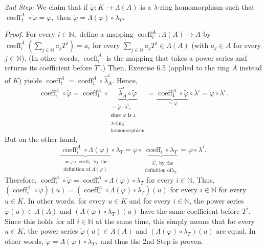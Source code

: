 \documentclass[numbers=enddot,12pt,final,onecolumn,notitlepage]{scrartcl}%
\begin{document}
\textit{2nd Step:} We claim that if $\widetilde{\varphi}:K\rightarrow
\Lambda\left(  A\right)  $ is a $\lambda$-ring homomorphism such that
$\operatorname*{coeff}\nolimits_{1}^{A}\circ\widetilde{\varphi}=\varphi,$ then
$\widetilde{\varphi}=\Lambda\left(  \varphi\right)  \circ\lambda_{T}.$

\textit{Proof.} For every $i\in\mathbb{N},$ define a mapping
$\operatorname*{coeff}\nolimits_{i}^{A}:\Lambda\left(  A\right)  \rightarrow
A$ by $\operatorname*{coeff}\nolimits_{i}^{A}\left(  \sum\limits_{j\in
\mathbb{N}}a_{j}T^{j}\right)  =a_{i}$ for every $\sum\limits_{j\in\mathbb{N}%
}a_{j}T^{j}\in\Lambda\left(  A\right)  $ (with $a_{j}\in A$ for every
$j\in\mathbb{N}$). (In other words, $\operatorname*{coeff}\nolimits_{i}^{A}$
is the mapping that takes a power series and returns its coefficient before
$T^{i}.$) Then, Exercise 6.5 (applied to the ring $A$ instead of $K$) yields
$\operatorname*{coeff}\nolimits_{i}^{A}=\operatorname*{coeff}\nolimits_{1}%
^{A}\circ\widehat{\lambda}_{A}^{i}.$ Hence,%
\[
\operatorname*{coeff}\nolimits_{i}^{A}\circ\widetilde{\varphi}%
=\operatorname*{coeff}\nolimits_{1}^{A}\circ\underbrace{\widehat{\lambda}%
_{A}^{i}\circ\widetilde{\varphi}}_{\substack{=\widetilde{\varphi}\circ
\lambda^{i},\\\text{since }\widetilde{\varphi}\text{ is a}\\\lambda
\text{-ring}\\\text{homomorphism}}}=\underbrace{\operatorname*{coeff}%
\nolimits_{1}^{A}\circ\widetilde{\varphi}}_{=\varphi}\circ\lambda^{i}%
=\varphi\circ\lambda^{i}.
\]
But on the other hand,%
\[
\underbrace{\operatorname*{coeff}\nolimits_{i}^{A}\circ\Lambda\left(
\varphi\right)  }_{\substack{=\varphi\circ\operatorname*{coeff}\nolimits_{i}%
\text{ by the}\\\text{definition of }\Lambda\left(  \varphi\right)  }%
}\circ\lambda_{T}=\varphi\circ\underbrace{\operatorname*{coeff}\nolimits_{i}%
\circ\lambda_{T}}_{\substack{=\lambda^{i}\text{, by the}\\\text{definition of
}\lambda_{T}}}=\varphi\circ\lambda^{i}.
\]
Therefore, $\operatorname*{coeff}\nolimits_{i}^{A}\circ\widetilde{\varphi
}=\operatorname*{coeff}\nolimits_{i}^{A}\circ\Lambda\left(  \varphi\right)
\circ\lambda_{T}$ for every $i\in\mathbb{N}$. Thus, $\left(
\operatorname*{coeff}\nolimits_{i}^{A}\circ\widetilde{\varphi}\right)  \left(
u\right)  =\left(  \operatorname*{coeff}\nolimits_{i}^{A}\circ\Lambda\left(
\varphi\right)  \circ\lambda_{T}\right)  \left(  u\right)  $ for every
$i\in\mathbb{N}$ for every $u\in K$. In other words, for every $u\in K$ and
for every $i\in\mathbb{N}$, the power series $\widetilde{\varphi}\left(
u\right)  \in\Lambda\left(  A\right)  $ and $\left(  \Lambda\left(
\varphi\right)  \circ\lambda_{T}\right)  \left(  u\right)  $ have the same
coefficient before $T^{i}$. Since this holds for all $i\in\mathbb{N}$ at the
same time, this simply means that for every $u\in K$, the power series
$\widetilde{\varphi}\left(  u\right)  \in\Lambda\left(  A\right)  $ and
$\left(  \Lambda\left(  \varphi\right)  \circ\lambda_{T}\right)  \left(
u\right)  $ are equal. In other words, $\widetilde{\varphi}=\Lambda\left(
\varphi\right)  \circ\lambda_{T},$ and thus the 2nd Step is proven.
\end{document}
